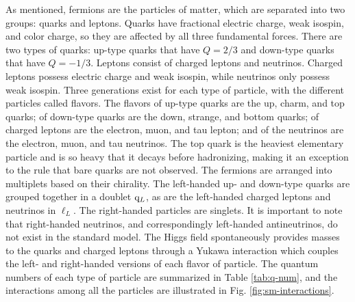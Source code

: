 As mentioned, fermions are the particles of matter, which are separated into two groups: quarks and leptons. Quarks have fractional electric charge, weak isospin, and color charge, so they are affected by all three fundamental forces. There are two types of quarks: up-type quarks that have $Q = 2/3$ and down-type quarks that have $Q = -1/3$. Leptons consist of charged leptons and neutrinos. Charged leptons possess electric charge and weak isospin, while neutrinos only possess weak isospin. Three generations exist for each type of particle, with the different particles called flavors. The flavors of up-type quarks are the up, charm, and top quarks; of down-type quarks are the down, strange, and bottom quarks; of charged leptons are the electron, muon, and tau lepton; and of the neutrinos are the electron, muon, and tau neutrinos. The top quark is the heaviest elementary particle and is so heavy that it decays before hadronizing, making it an exception to the rule that bare quarks are not observed. The fermions are arranged into multiplets based on their chirality. The left-handed up- and down-type quarks are grouped together in a doublet $\mathrm{q}_L$, as are the left-handed charged leptons and neutrinos in $\ell_L$. The right-handed particles are singlets. It is important to note that right-handed neutrinos, and correspondingly left-handed antineutrinos, do not exist in the standard model. The Higgs field spontaneously provides masses to the quarks and charged leptons through a Yukawa interaction which couples the left- and right-handed versions of each flavor of particle. The quantum numbers of each type of particle are summarized in Table \ref{tab:q-num}, and the interactions among all the particles are illustrated in Fig. \ref{fig:sm-interactions}.

